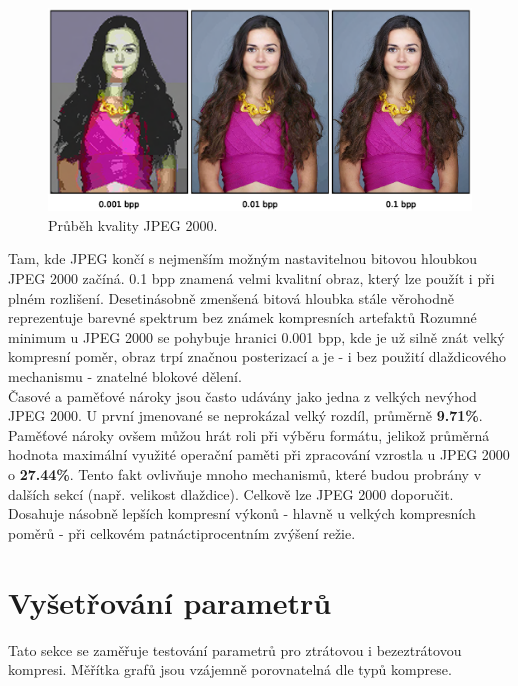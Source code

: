 \clearpage
\begin{figure}[hbt!]
  \centering
  \hspace*{-0.75cm}
  \includegraphics[width=16cm]{obrazky-figures/odhad/fotky_kvalita_odhad.eps}
  \caption{Průběh kvality JPEG 2000.}
\end{figure}

\noindent Tam, kde JPEG končí s nejmenším možným nastavitelnou bitovou hloubkou JPEG 2000 začíná. 0.1 bpp znamená velmi kvalitní obraz, který lze použít i při plném rozlišení. Desetinásobně zmenšená bitová hloubka stále věrohodně reprezentuje barevné spektrum bez známek kompresních artefaktů Rozumné minimum u JPEG 2000 se pohybuje hranici 0.001 bpp, kde je už silně znát velký kompresní poměr, obraz trpí značnou posterizací a je - i bez použití dlaždicového mechanismu - znatelné blokové dělení.\\
Časové a paměťové nároky jsou často udávány jako jedna z velkých nevýhod JPEG 2000. U první jmenované se neprokázal velký rozdíl, průměrně \textbf{9.71\%}. Paměťové nároky ovšem můžou hrát roli při výběru formátu, jelikož průměrná hodnota maximální využité operační paměti při zpracování vzrostla u JPEG 2000 o \textbf{27.44\%}. Tento fakt ovlivňuje mnoho mechanismů, které budou probrány v dalších sekcí (např. velikost dlaždice). Celkově lze JPEG 2000 doporučit. Dosahuje násobně lepších kompresní výkonů - hlavně u velkých kompresních poměrů - při celkovém patnáctiprocentním zvýšení režie. 

\clearpage
\newpage
\section{Vyšetřování parametrů}
Tato sekce se zaměřuje testování parametrů pro ztrátovou i bezeztrátovou kompresi. Měřítka grafů jsou vzájemně porovnatelná dle typů komprese.
%
%
